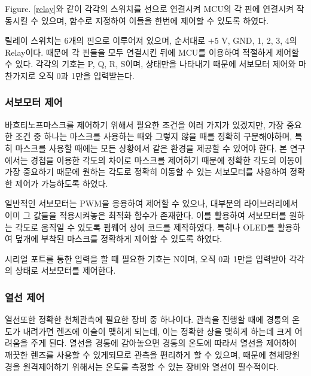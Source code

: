 \textrm{Figure}. \ref{relay}와 같이 각각의 스위치를 선으로 연결시켜 MCU의 각 핀에 연결시켜 작동시킬 수 있으며, 함수로 지정하여 이들을 한번에 제어할 수 있도록 하였다.

릴레이 스위치는 6개의 핀으로 이루어져 있으며, 순서대로 $\textrm{+5 V}$, GND, 1, 2, 3, 4의 Relay이다. 때문에 각 핀들을 모두 연결시킨 뒤에 MCU를 이용하여 적절하게 제어할 수 있다. 각각의 기호는 P, Q, R, S이며, 상태만을 나타내기 때문에 서보모터 제어와 마찬가지로 오직 0과 1만을 입력받는다.



\subsubsection{서보모터 제어}
바흐티노프마스크를 제어하기 위해서 필요한 조건을 여러 가지가 있겠지만, 가장 중요한 조건 중 하나는 마스크를 사용하는 때와 그렇지 않을 때를 정확히 구분해야하며, 특히 마스크를 사용할 때에는 모든 상황에서 같은 환경을 제공할 수 있어야 한다. 본 연구에서는 경첩을 이용한 각도의 차이로 마스크를 제어하기 때문에 정확한 각도의 이동이 가장 중요하기 때문에 원하는 각도로 정확히 이동할 수 있는 서보모터를 사용하여 정확한 제어가 가능하도록 하였다.

일반적인 서보모터는 PWM을 응용하여 제어할 수 있으나, 대부분의 라이브러리에서 이미 그 값들을 적용시켜놓은 최적화 함수가 존재한다. 이를 활용하여 서보모터를 원하는 각도로 움직일 수 있도록 펌웨어 상에 코드를 제작하였다. 특히나 OLED를 활용하여 덮개에 부착된 마스크를 정확하게 제어할 수 있도록 하였다.

시리얼 포트를 통한 입력을 할 때 필요한 기호는 N이며, 오직 0과 1만을 입력받아 각각의 상태로 서보모터를 제어한다.



\subsubsection{열선 제어}
열선또한 정확한 천체관측에 필요한 장비 중 하나이다. 관측을 진행할 때에 경통의 온도가 내려가면 렌즈에 이슬이 맺히게 되는데, 이는 정확한 상을 맺히게 하는데 크게 어려움을 주게 된다. 열선을 경통에 감아놓으면 경통의 온도에 따라서 열선을 제어하여 깨끗한 렌즈를 사용할 수 있게되므로 관측을 편리하게 할 수 있으며, 때문에 천체망원경을 원격제어하기 위해서는 온도를 측정할 수 있는 장비와 열선이 필수적이다. 

